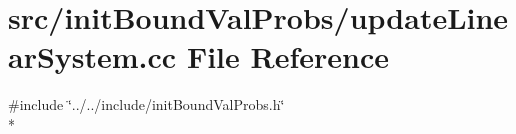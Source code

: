 \section{src/init\-Bound\-Val\-Probs/update\-Linear\-System.cc File Reference}
\label{update_linear_system_8cc}
{\ttfamily \#include \char`\"{}../../include/init\-Bound\-Val\-Probs.\-h\char`\"{}}\\*

